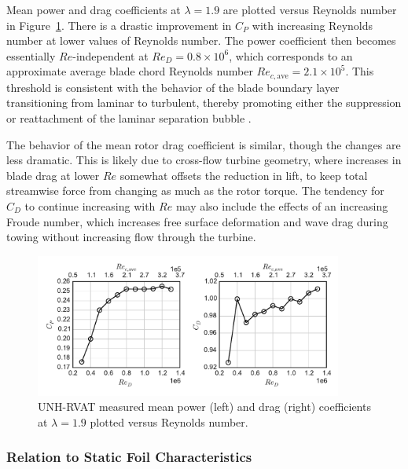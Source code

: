 \documentclass[energies,article,accept,moreauthors,pdftex,12pt,a4paper]{mdpi}
\begin{document}
Mean power and drag coefficients at $\lambda=1.9$ are plotted versus Reynolds
number in Figure~\ref{fig:perf-Re-dep}. There is a drastic improvement in $C_P$
with increasing Reynolds number at lower values of Reynolds number. The power
coefficient then becomes  essentially $Re$-independent at $Re_D = 0.8 \times
10^6$, which corresponds to an approximate average blade chord Reynolds number
$Re_{c, \mathrm{ave}} = 2.1 \times 10^5$. This threshold is consistent with the
behavior of the blade boundary layer transitioning from laminar to turbulent,
thereby promoting either the suppression or reattachment of the laminar
separation bubble \cite{Lissaman1983}.

The behavior of the mean rotor drag coefficient is similar, though the changes
are less dramatic. This is likely due to cross-flow turbine geometry, where
increases in blade drag at lower $Re$ somewhat offsets the reduction in lift, to
keep total streamwise force from changing as much as the rotor torque. The
tendency for $C_D$ to continue increasing with $Re$ may also include the 
effects of an 
increasing Froude number, which increases free surface deformation and
wave drag during towing without increasing flow through the turbine.

\begin{figure}[ht]
\centering

\includegraphics[width=0.9\textwidth]{figures/perf_re_dep}

\caption{UNH-RVAT measured mean power (left) and drag (right) coefficients at
    $\lambda=1.9$ plotted versus Reynolds number.}

\label{fig:perf-Re-dep}
\end{figure}


\subsubsection{Relation to Static Foil Characteristics}
\end{document}
